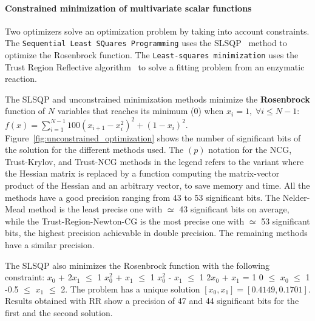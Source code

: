 \paragraph{Constrained minimization of multivariate scalar functions}
Two optimizers solve an optimization problem by taking into account constraints.
The \texttt{Sequential Least SQuares Programming} uses the
SLSQP~\cite{kraft1988software} method to optimize the Rosenbrock function. The
\texttt{Least-squares minimization} uses the Trust Region Reflective
algorithm~\cite{li1993centering} to solve a fitting problem from an enzymatic
reaction.

The SLSQP and unconstrained minimization methods minimize the
\textbf{Rosenbrock} function of $N$ variables that reaches its minimum (0) when
$x_i=1,\; \forall i \leq N-1$:
$f(x) = \sum_{i=1}^{N-1} 100(x_{i+1}-x^2_i)^2 + (1-x_i)^2$.
Figure~\ref{fig:unconstrained_optimization} shows the number of significant bits
of the solution for the different methods used. The $(p)$ notation for the NCG,
Trust-Krylov, and Trust-NCG methods in the legend refers to the variant where
the Hessian matrix is replaced by a function computing the matrix-vector product
of the Hessian and an arbitrary vector, to save memory and time. All the methods
have a good precision ranging from 43 to 53 significant bits. The Nelder-Mead
method is the least precise one with $\simeq$ 43 significant bits on average,
while the Trust-Region-Newton-CG is the most precise one with $\simeq$ 53
significant bits, the highest precision achievable in double precision. The
remaining methods have a similar precision.

The SLSQP also minimizes the Rosenbrock function with the following constraint:
$x_0$ + $2x_1$ $\leq$ 1
$x_0^2$ + $x_1$ $\leq$ 1
$x_0^2$ - $x_1$ $\leq$ 1
$2x_0$ + $x_1$ = 1
0 $\leq$ $x_0$ $\leq$ 1
-0.5 $\leq$ $x_1$ $\leq$ 2.
The problem has a unique solution $[x_0, x_1] = [0.4149, 0.1701]$. Results
obtained with RR show a precision of 47 and 44 significant bits for the first
and the second solution. %

